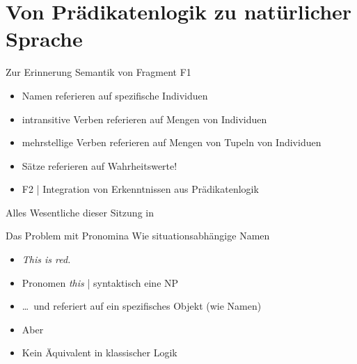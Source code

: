 \section{Von Prädikatenlogik zu natürlicher Sprache}

\begin{frame}
  {Zur Erinnerung}
  \onslide<+->
  \onslide<+->
  Semantik von Fragment F1\\
  \Halbzeile
  \begin{itemize}[<+->]
    \item Namen referieren auf \alert{spezifische Individuen}
    \item intransitive Verben referieren auf \alert{Mengen von Individuen}
    \item mehrstellige Verben referieren auf Mengen von \alert{Tupeln von Individuen}
    \item Sätze referieren auf \alert{Wahrheitswerte}!
      \Halbzeile
    \item F2 | Integration von Erkenntnissen aus Prädikatenlogik
  \end{itemize}
  \onslide<+->
  \Zeile
  \centering 
  Alles Wesentliche dieser Sitzung in \citet[Kapitel~3]{ChierchiaMcconnellginet2000}
\end{frame}

\begin{frame}
  {Das Problem mit Pronomina}
  \onslide<+->
  \onslide<+->
  Wie situationsabhängige Namen\\
  \Halbzeile
  \begin{itemize}[<+->]
    \item[ ] \textit{\alert{This} is red.}
    \item Pronomen \alert{\textit{this}} | syntaktisch eine NP
    \item \ldots\ und referiert auf \alert{ein spezifisches Objekt} (wie Namen)\\
      \Halbzeile
    \item Aber \\
    \item Kein Äquivalent in klassischer Logik
  \end{itemize}
\end{frame}

